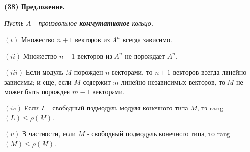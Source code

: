 \documentclass{mai_book}
\begin{document}
	\noindent
	{\bf (38) Предложение.}
	
	{\it Пусть $A$ - произвольное {\bf коммутативное} кольцо.
		
	$(i)$ Множество $n + 1$ векторов из $A^n$ всегда зависимо.
	
	$(ii)$ Множество $n - 1$ векторов из $A^n$ не порождает $A^n$.
	
	$(iii)$ Если модуль $M$ порожден $n$ векторами, то $n + 1$ векторов всегда\linebreak
	линейно зависимы; и еще, если $M$ содержит $m$ линейно независимых\linebreak
	векторов, то $M$ не может быть порожден $m - 1$ векторами.
	
	$(iv)$ Если $L$ - свободный подмодуль модуля конечного типа $M$, то\linebreak
	rang$(L) \leqslant \rho(M)$.
	
	$(v)$ В частности, если $M$ - свободный подмодуль конечного типа,\linebreak
	то rang$(M) \leqslant \rho(M)$.}
	
	\pagebreak
	
	
\end{document}
